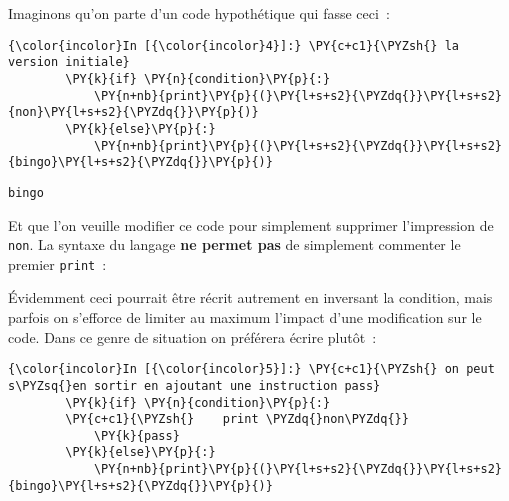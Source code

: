     Imaginons qu'on parte d'un code hypothétique qui fasse ceci~:

    \begin{Verbatim}[commandchars=\\\{\},frame=single,framerule=0.3mm,rulecolor=\color{cellframecolor}]
{\color{incolor}In [{\color{incolor}4}]:} \PY{c+c1}{\PYZsh{} la version initiale}
        \PY{k}{if} \PY{n}{condition}\PY{p}{:}
            \PY{n+nb}{print}\PY{p}{(}\PY{l+s+s2}{\PYZdq{}}\PY{l+s+s2}{non}\PY{l+s+s2}{\PYZdq{}}\PY{p}{)}
        \PY{k}{else}\PY{p}{:}
            \PY{n+nb}{print}\PY{p}{(}\PY{l+s+s2}{\PYZdq{}}\PY{l+s+s2}{bingo}\PY{l+s+s2}{\PYZdq{}}\PY{p}{)}
\end{Verbatim}


    \begin{Verbatim}[commandchars=\\\{\},frame=single,framerule=0.3mm,rulecolor=\color{cellframecolor}]
bingo
\end{Verbatim}

    Et que l'on veuille modifier ce code pour simplement supprimer
l'impression de \texttt{non}. La syntaxe du langage \textbf{ne permet
pas} de simplement commenter le premier \texttt{print}~:

\begin{Shaded}
\begin{Highlighting}[frame=lines,framerule=0.6mm,rulecolor=\color{asisframecolor}]
\NormalTok{:}
     
\end{Highlighting}
\end{Shaded}

    Évidemment ceci pourrait être récrit autrement en inversant la
condition, mais parfois on s'efforce de limiter au maximum l'impact
d'une modification sur le code. Dans ce genre de situation on préférera
écrire plutôt~:

    \begin{Verbatim}[commandchars=\\\{\},frame=single,framerule=0.3mm,rulecolor=\color{cellframecolor}]
{\color{incolor}In [{\color{incolor}5}]:} \PY{c+c1}{\PYZsh{} on peut s\PYZsq{}en sortir en ajoutant une instruction pass}
        \PY{k}{if} \PY{n}{condition}\PY{p}{:}
        \PY{c+c1}{\PYZsh{}    print \PYZdq{}non\PYZdq{}}
            \PY{k}{pass}
        \PY{k}{else}\PY{p}{:}
            \PY{n+nb}{print}\PY{p}{(}\PY{l+s+s2}{\PYZdq{}}\PY{l+s+s2}{bingo}\PY{l+s+s2}{\PYZdq{}}\PY{p}{)}
\end{Verbatim}


